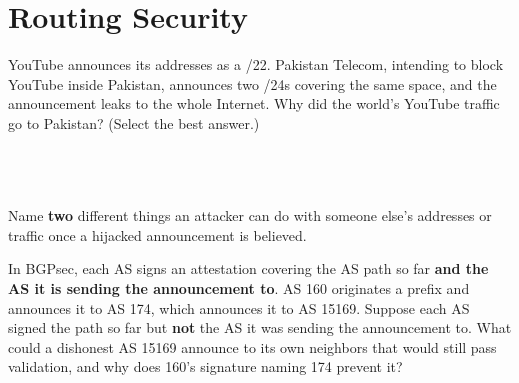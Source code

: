 \par\vspace{1.2ex}\noindent\begin{minipage}{\linewidth}
\section*{Routing Security}

 YouTube announces its addresses as a /22. Pakistan Telecom, intending to
block YouTube inside Pakistan, announces two /24s covering the same space, and the
announcement leaks to the whole Internet. Why did the world's YouTube traffic go
to Pakistan? (Select the best answer.)\\
\\
\\
\\
\eprob
\end{minipage}\par

\par\noindent\begin{minipage}{\linewidth}
 Name {\bf two} different things an attacker can do with someone else's
addresses or traffic once a hijacked announcement is believed.

\eprob
\end{minipage}\par

\par\noindent\begin{minipage}{\linewidth}
 In BGPsec, each AS signs an attestation covering the AS path so far
{\bf and the AS it is sending the announcement to}. AS 160 originates a prefix and announces it to AS 174, which announces it to
AS 15169. Suppose each AS signed the path so far but {\bf not} the AS it was sending
the announcement to. What could a dishonest AS 15169 announce to its own neighbors
that would still pass validation, and why does 160's signature naming 174 prevent it?

\eprob
\end{minipage}\par


